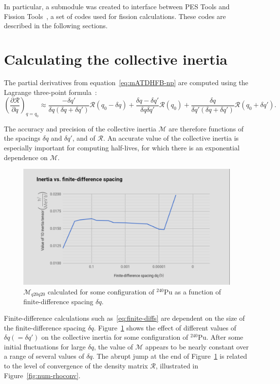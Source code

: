 In particular, a submodule was created to interface between PES Tools and Fission Tools~\cite{fission_tools}, a set of codes used for fission calculations. These codes are described in the following sections.

\section{Calculating the collective inertia}\label{sect:M_numerical}
The partial derivatives from equation~\eqref{eq:mATDHFB-np} are computed using the Lagrange three-point formula~\cite{Baran2011}:
\begin{equation}\label{eq:finite-diffs}
\left(\frac{\partial \mathcal{R}}{\partial q}\right)_{q=q_0} \approx 
    \frac{-\delta q'}{\delta q \left(\delta q + \delta q'\right)}\mathcal{R}(q_0-\delta q) + 
    \frac{\delta q - \delta q'}{\delta q \delta q'}\mathcal{R}(q_0) + 
    \frac{\delta q}{\delta q' \left(\delta q + \delta q'\right)}\mathcal{R}(q_0+\delta q') .
\end{equation}

\noindent The accuracy and precision of the collective inertia $\mathcal{M}$ are therefore functions of the spacings $\delta q$ and $\delta q'$, and of $\mathcal{R}$. An accurate value of the collective inertia is especially important for computing half-lives, for which there is an exponential dependence on $\mathcal{M}$.

\begin{figure}
	\centering
	\includegraphics[width=0.7\linewidth]{TeX_files/Num-dq_spacing}
	\caption{$\mathcal{M}_{q20q20}$ calculated for some configuration of $^{240}$Pu as a function of finite-difference spacing $\delta q$.}
	\label{fig:num-dqspacing}
\end{figure}

Finite-difference calculations such as~\eqref{eq:finite-diffs} are dependent on the size of the finite-difference spacing $\delta q$. Figure~\ref{fig:num-dqspacing} shows the effect of different values of $\delta q (= \delta q')$ on the collective inertia for some configuration of $^{240}$Pu. After some initial fluctuations for large $\delta q$, the value of $\mathcal{M}$ appears to be nearly constant over a range of several values of $\delta q$. The abrupt jump at the end of Figure~\ref{fig:num-dqspacing} is related to the level of convergence of the density matrix $\mathcal{R}$, illustrated in Figure~\ref{fig:num-rhoconv}.

